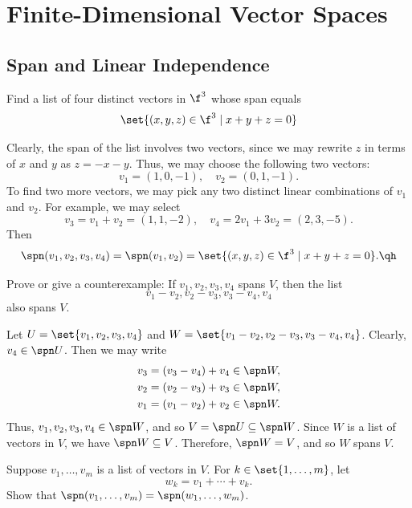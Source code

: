 \section{Finite-Dimensional Vector Spaces}

\subsection{Span and Linear Independence}

\begin{exercise}[2a1]
    Find a list of four distinct vectors in $\f^3$ whose span equals
    \[\set{(x, y, z) \in \f^3 \mid x + y + z = 0}\]
\end{exercise}

\begin{sol}
    Clearly, the span of the list involves two vectors, since we may rewrite $z$ in terms of $x$ and $y$ as $z = -x - y$. Thus, we may choose the following two vectors:
    \[v_1 = (1, 0, -1), \quad v_2 = (0, 1, -1).\]
    To find two more vectors, we may pick any two distinct linear combinations of $v_1$ and $v_2$. For example, we may select
    \[v_3 = v_1 + v_2 = (1, 1, -2), \quad v_4 = 2v_1 + 3v_2 = (2, 3, -5).\]
    Then
    \[\spn(v_1, v_2, v_3, v_4) = \spn(v_1, v_2) = \set{(x, y, z) \in \f^3 \mid x + y + z = 0}. \qh\]
\end{sol}

\begin{exercise}[2a2]
    Prove or give a counterexample: If $v_1, v_2, v_3, v_4$ spans $V$, then the list
    \[v_1 - v_2, v_2 - v_3, v_3 - v_4, v_4\]
    also spans $V$.
\end{exercise}

\begin{sol}
    Let $U = \set{v_1, v_2, v_3, v_4}$ and $W = \set{v_1 - v_2, v_2 - v_3, v_3 - v_4, v_4}$. Clearly, $v_4 \in \spn U$. Then we may write
    \begin{align*}
        v_3 &= (v_3 - v_4) + v_4 \in \spn W, \\
        v_2 &= (v_2 - v_3) + v_3 \in \spn W, \\
        v_1 &= (v_1 - v_2) + v_2 \in \spn W.
    \end{align*}
    Thus, $v_1, v_2, v_3, v_4 \in \spn W$, and so $V = \spn U \subseteq \spn W$. Since $W$ is a list of vectors in $V$, we have $\spn W \subseteq V$. Therefore, $\spn W = V$, and so $W$ spans $V$.
\end{sol}
 
\begin{exercise}[2a3]
    Suppose $v_1, \ldots, v_m$ is a list of vectors in $V$. For $k \in \set{1, \ldots, m}$, let
    \[w_k = v_1 + \cdots + v_k.\]
    Show that $\spn(v_1, \ldots, v_m) = \spn(w_1, \ldots, w_m)$.
\end{exercise}

